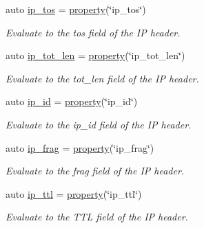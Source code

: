 \begin{DoxyCompactItemize}
auto \hyperlink{namespacepfq_1_1lang_1_1anonymous__namespace_02default_8hpp_03_acc5d2b786c39d4177ab37ee16ee2295d}{ip\+\_\+tos} = \hyperlink{namespacepfq_1_1lang_a1249450e72229273b0db707a286aea91}{property}(\char`\"{}ip\+\_\+tos\char`\"{})
\begin{DoxyCompactList}\small\item\em Evaluate to the {\ttfamily tos} field of the IP header. \end{DoxyCompactList}\item 
auto \hyperlink{namespacepfq_1_1lang_1_1anonymous__namespace_02default_8hpp_03_a48d42ce1bea31f55be3377e8f2c41bbe}{ip\+\_\+tot\+\_\+len} = \hyperlink{namespacepfq_1_1lang_a1249450e72229273b0db707a286aea91}{property}(\char`\"{}ip\+\_\+tot\+\_\+len\char`\"{})
\begin{DoxyCompactList}\small\item\em Evaluate to the {\ttfamily tot\+\_\+len} field of the IP header. \end{DoxyCompactList}\item 
auto \hyperlink{namespacepfq_1_1lang_1_1anonymous__namespace_02default_8hpp_03_a87620275a9e9760978d5660be0582852}{ip\+\_\+id} = \hyperlink{namespacepfq_1_1lang_a1249450e72229273b0db707a286aea91}{property}(\char`\"{}ip\+\_\+id\char`\"{})
\begin{DoxyCompactList}\small\item\em Evaluate to the {\ttfamily ip\+\_\+id} field of the IP header. \end{DoxyCompactList}\item 
auto \hyperlink{namespacepfq_1_1lang_1_1anonymous__namespace_02default_8hpp_03_a46050d7137792fba0ca6d1b9cb75ad0d}{ip\+\_\+frag} = \hyperlink{namespacepfq_1_1lang_a1249450e72229273b0db707a286aea91}{property}(\char`\"{}ip\+\_\+frag\char`\"{})
\begin{DoxyCompactList}\small\item\em Evaluate to the {\ttfamily frag} field of the IP header. \end{DoxyCompactList}\item 
auto \hyperlink{namespacepfq_1_1lang_1_1anonymous__namespace_02default_8hpp_03_a885339d6e5b34ec5d037e085dfba9851}{ip\+\_\+ttl} = \hyperlink{namespacepfq_1_1lang_a1249450e72229273b0db707a286aea91}{property}(\char`\"{}ip\+\_\+ttl\char`\"{})
\begin{DoxyCompactList}\small\item\em Evaluate to the {\ttfamily T\+TL} field of the IP header. \end{DoxyCompactList}\item 

\end{DoxyCompactItemize}
